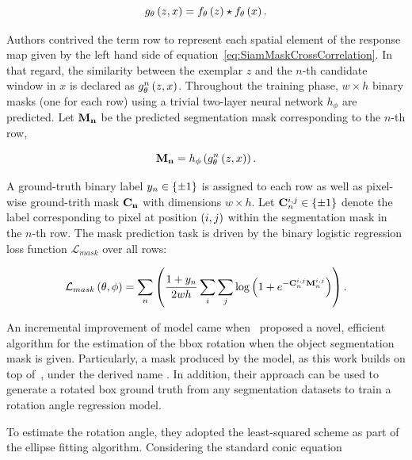 \begin{equation}
    \label{eq:SiamMaskCrossCorrelation}
    {g_\theta} \left( z, x \right) = {f_\theta} \left( z \right) \star {f_\theta} \left( x \right).
\end{equation}

\noindent Authors contrived the term \gls{row} to represent each spatial element of the response map given by the left hand side of equation~\ref{eq:SiamMaskCrossCorrelation}. In that regard, the similarity between the exemplar $z$ and the $n$-th candidate window in $x$ is declared as ${{g}_{\theta}^{n}} \left( z, x \right)$. Throughout the training phase, $w \times h$ binary masks (one for each \gls{row}) using a trivial two-layer neural network $h_\phi$ are predicted. Let $\mathbf{M_n}$ be the predicted segmentation mask corresponding to the $n$-th \gls{row},

\begin{equation}
    \mathbf{M_n} = {h_\phi} \left( {{g}_{\theta}^{n}} \left( z, x \right) \right).
\end{equation}

\noindent A ground-truth binary label $y_n \in \left\{ {\pm 1} \right\}$ is assigned to each \gls{row} as well as pixel-wise ground-trith mask $\mathbf{C_n}$ with dimensions $w \times h$. Let $\mathbf{C}_n^{i,j} \in \left\{ {\pm 1} \right\}$ denote the label corresponding to pixel at position $\left( {i, j} \right)$ within the segmentation mask in the $n$-th \gls{row}. The mask prediction task is driven by the binary logistic regression loss function $\mathcal{L}_{mask}$ over all \glspl{row}:

\begin{equation}
    {\mathcal{L}_{mask}} \left( \theta, \phi \right) =
    \sum_n
    \left( {
        \frac{1 + y_n}{2wh}
        \sum_{i}
        \sum_{j}
        {\log} \left( 1 + e^{-\mathbf{C}_n^{i,j} \mathbf{M}_n^{i,j}} \right)
    } \right).
\end{equation}

An incremental improvement of  model came when~\cite{Chen2019} proposed a novel, efficient algorithm for the estimation of the \gls{bbox} rotation when the object segmentation mask is given. Particularly, a mask produced by the  model, as this work builds on top of~\cite{Wang2019}, under the derived name . In addition, their approach can be used to generate a rotated box ground truth from any segmentation datasets to train a rotation angle regression model.

To estimate the rotation angle, they adopted the least-squared scheme as part of the ellipse fitting algorithm. Considering the standard conic equation

